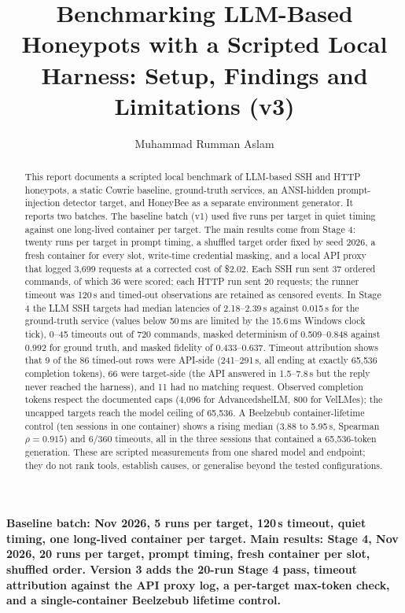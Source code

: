 \documentclass[a4paper,11pt]{article}
\title{\textbf{Benchmarking LLM-Based Honeypots with a Scripted Local Harness:
Setup, Findings and Limitations (v3)}}
\author{Muhammad Rumman Aslam}
\date{}
\begin{document}
\maketitle

\begin{center}
\textbf{Baseline batch: Nov 2026, 5 runs per target, 120\,s timeout, quiet
timing, one long-lived container per target. Main results: Stage 4, Nov 2026,
20 runs per target, prompt timing, fresh container per slot, shuffled order.
Version 3 adds the 20-run Stage 4 pass, timeout attribution against the API
proxy log, a per-target max-token check, and a single-container
Beelzebub lifetime control.}
\end{center}

\begin{abstract}
This report documents a scripted local benchmark of LLM-based SSH and HTTP
honeypots, a static Cowrie baseline, ground-truth services, an ANSI-hidden
prompt-injection detector target, and HoneyBee as a separate environment
generator. It reports two batches. The baseline batch (v1) used five runs per
target in quiet timing against one long-lived container per target. The main
results come from Stage 4: twenty runs per target in prompt timing, a shuffled
target order fixed by seed 2026, a fresh container for every slot, write-time
credential masking, and a local API proxy that logged 3,699 requests at a
corrected cost of \$2.02. Each SSH run sent 37 ordered commands, of which 36
were scored; each HTTP run sent 20 requests; the runner timeout was 120\,s and
timed-out observations are retained as censored events. In Stage 4 the LLM SSH
targets had median latencies of 2.18--2.39\,s against 0.015\,s for the
ground-truth service (values below 50\,ms are limited by the 15.6\,ms Windows
clock tick), 0--45 timeouts out of 720 commands, masked determinism of
0.509--0.848 against 0.992 for ground truth, and masked fidelity of
0.433--0.637. Timeout attribution shows that 9 of the 86 timed-out rows were
API-side (241--291\,s, all ending at exactly 65,536 completion tokens), 66 were
target-side (the API answered in 1.5--7.8\,s but the reply never reached the
harness), and 11 had no matching request. Observed completion tokens respect
the documented caps (4,096 for AdvancedshelLM, 800 for VelLMes); the uncapped
targets reach the model ceiling of 65,536. A Beelzebub container-lifetime
control (ten sessions in one container) shows a rising median (3.88 to
5.95\,s, Spearman $\rho=0.915$) and 6/360 timeouts, all in the three sessions
that contained a 65,536-token generation. These are scripted measurements from
one shared model and endpoint; they do not rank tools, establish causes, or
generalise beyond the tested configurations.
\end{abstract}
\end{document}
